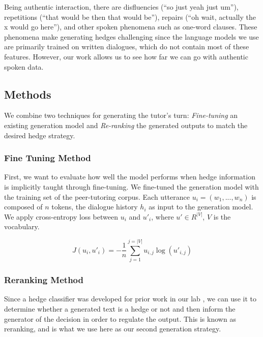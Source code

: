 \documentclass[11pt]{article}
\begin{document}

Being authentic interaction, there are disfluencies (``so just yeah just um''), repetitions (``that would be then that would be''), repairs (``oh wait, actually the x would go here''), and other spoken phenomena such as one-word clauses. These phenomena make generating hedges challenging since the language models we use are primarily trained on written dialogues, which do not contain most of these features. However, our work allows us to see how far we can go with authentic spoken data. 

\subsection{Methods}
We combine two techniques for generating the tutor's turn: \emph{Fine-tuning} an existing generation model and \emph{Re-ranking} the generated outputs to match the desired hedge strategy.

\subsubsection{Fine Tuning Method}
First, we want to evaluate how well the model performs when hedge information is implicitly taught through fine-tuning.
We fine-tuned the generation model with the training set of the peer-tutoring corpus. Each utterance $u_i = (w_1,...,w_n)$ is composed of $n$ tokens, the dialogue history $h_i$ as input to the generation model. We apply cross-entropy loss between $u_i$ and $u'_i$, where $u' \in R^{|V|}$, $V$ is the vocabulary.

\begin{equation}
    J(u_i,u'_i) = -\frac{1}{n}\sum_{j=1}^{j=|V|} u_{i,j}\log(u'_{i,j})
    \label{eq:fine-tuning}
\end{equation}
    
\subsubsection{Reranking Method}
Since a hedge classifier was developed for prior work in our lab \citep{goel2019a, raphalen-etal-2022-might}, we can use it to determine whether a generated text is a hedge or not and then inform the generator of the decision in order to regulate the output. This is known as reranking, and is what we use here as our second generation strategy.
\end{document}
